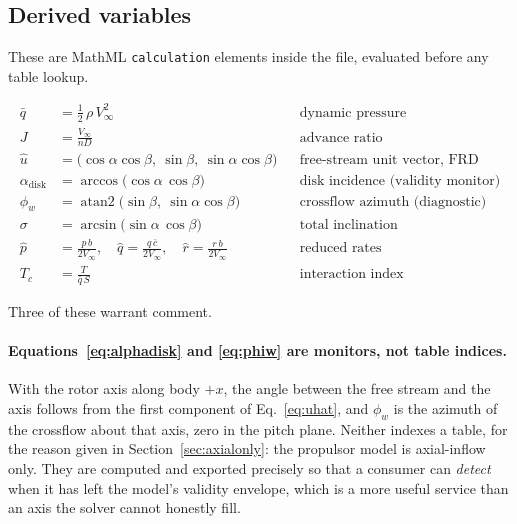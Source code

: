 \documentclass[11pt,a4paper]{article}
\begin{document}
\subsection{Derived variables}
\label{sec:derived}

These are MathML \texttt{calculation} elements inside the file, evaluated
before any table lookup.

\begin{align}
\bar q &= \tfrac{1}{2}\,\rho\,V_\infty^2
  &&\text{dynamic pressure} \label{eq:qbar}\\[1mm]
J &= \frac{V_\infty}{n D}
  &&\text{advance ratio} \label{eq:J}\\[1mm]
\hat u &= \bigl(\cos\alpha\cos\beta,\ \sin\beta,\
  \sin\alpha\cos\beta\bigr)
  &&\text{free-stream unit vector, FRD} \label{eq:uhat}\\[1mm]
\alpha_{\mathrm{disk}} &= \arccos\bigl(\cos\alpha\,\cos\beta\bigr)
  &&\text{disk incidence (validity monitor)} \label{eq:alphadisk}\\[1mm]
\phi_w &= \operatorname{atan2}\!\bigl(\sin\beta,\
  \sin\alpha\cos\beta\bigr)
  &&\text{crossflow azimuth (diagnostic)} \label{eq:phiw}\\[1mm]
\sigma &= \arcsin\bigl(\sin\alpha\,\cos\beta\bigr)
  &&\text{total inclination} \label{eq:sigma}\\[1mm]
\hat p &= \frac{p\,b}{2V_\infty}, \quad
\hat q = \frac{q\,\bar c}{2V_\infty}, \quad
\hat r = \frac{r\,b}{2V_\infty}
  &&\text{reduced rates} \label{eq:rates}\\[1mm]
T_c &= \frac{T}{\bar q\,S}
  &&\text{interaction index} \label{eq:Tc}
\end{align}

Three of these warrant comment.

\paragraph{Equations~\eqref{eq:alphadisk} and \eqref{eq:phiw} are
monitors, not table indices.} With the rotor axis along body $+x$, the
angle between the free stream and the axis follows from the first
component of Eq.~\eqref{eq:uhat}, and $\phi_w$ is the azimuth of the
crossflow about that axis, zero in the pitch plane. Neither indexes a
table, for the reason given in Section~\ref{sec:axialonly}: the
propulsor model is axial-inflow only. They are computed and exported
precisely so that a consumer can \emph{detect} when it has left the
model's validity envelope, which is a more useful service than an axis
the solver cannot honestly fill.
\end{document}

